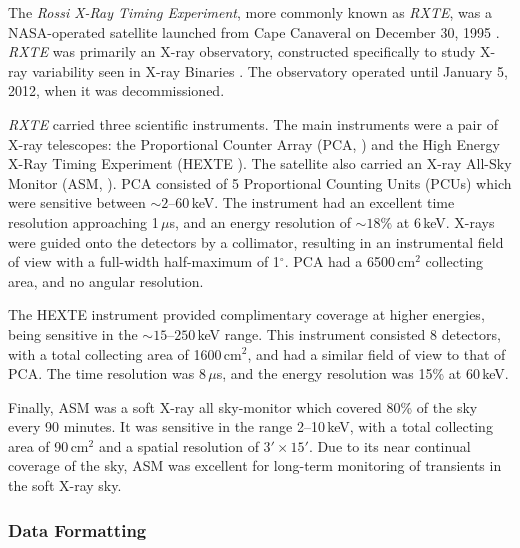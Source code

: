 \par The \textit{Rossi X-Ray Timing Experiment}, more commonly known as \textit{RXTE}, was a NASA-operated satellite launched from Cape Canaveral on December 30, 1995 \citep{Bradt_RXTE}.  \textit{RXTE} was primarily an X-ray observatory, constructed specifically to study X-ray variability seen in X-ray Binaries \citep{Bradt_XTEaims}.  The observatory operated until January 5, 2012, when it was decommissioned.
\par \textit{RXTE} carried three scientific instruments.  The main instruments were a pair of X-ray telescopes: the Proportional Counter Array (PCA, \citealp{Jahoda_PCA}) and the High Energy X-Ray Timing Experiment (HEXTE \citealp{Gruber_HEXTE}).  The satellite also carried an X-ray All-Sky Monitor (ASM, \citealp{Levine_ASM}).  PCA consisted of 5 Proportional Counting Units (PCUs) which were sensitive between $\sim2$--$60$\,keV.  The instrument had an excellent time resolution approaching 1\,$\mu$s, and an energy resolution of $\sim18\%$ at 6\,keV.  X-rays were guided onto the detectors by a collimator, resulting in an instrumental field of view with a full-width half-maximum of 1$^\circ$.  PCA had a 6500\,cm$^2$ collecting area, and no angular resolution.
\par The HEXTE instrument \citep{Gruber_HEXTE} provided complimentary coverage at higher energies, being sensitive in the $\sim15$--$250$\,keV range.  This instrument consisted 8 detectors, with a total collecting area of 1600\,cm$^2$, and had a similar field of view to that of PCA.  The time resolution was 8\,$\mu$s, and the energy resolution was 15\% at 60\,keV.
\par Finally, ASM was a soft X-ray all sky-monitor which covered 80\% of the sky every 90 minutes.  It was sensitive in the range 2--10\,keV, with a total collecting area of 90\,cm$^2$ and a spatial resolution of $3'\times15'$.  Due to its near continual coverage of the sky, ASM was excellent for long-term monitoring of transients in the soft X-ray sky.

\subsubsection{Data Formatting}

